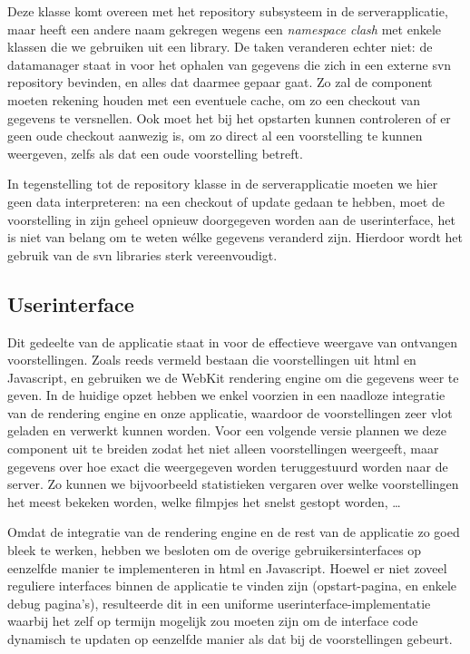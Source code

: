 Deze klasse komt overeen met het repository subsysteem in de serverapplicatie, maar heeft een andere naam gekregen wegens een \emph{namespace clash} met enkele klassen die we gebruiken uit een library. De taken veranderen echter niet: de datamanager staat in  voor het ophalen van gegevens die zich in een externe \ac{svn} repository bevinden, en alles dat daarmee gepaar gaat. Zo zal de component moeten rekening houden met een eventuele cache, om zo een checkout van gegevens te versnellen. Ook moet het bij het opstarten kunnen controleren of er geen oude checkout aanwezig is, om zo direct al een voorstelling te kunnen weergeven, zelfs als dat een oude voorstelling betreft.

In tegenstelling tot de repository klasse in de serverapplicatie moeten we hier geen data interpreteren: na een checkout of update gedaan te hebben, moet de voorstelling in zijn geheel opnieuw doorgegeven worden aan de userinterface, het is niet van belang om te weten wélke gegevens veranderd zijn. Hierdoor wordt het gebruik van de \ac{svn} libraries sterk vereenvoudigt.

\subsection{Userinterface}

Dit gedeelte van de applicatie staat in voor de effectieve weergave van ontvangen voorstellingen. Zoals reeds vermeld bestaan die voorstellingen uit \ac{html} en Javascript, en gebruiken we de WebKit rendering engine om die gegevens weer te geven. In de huidige opzet hebben we enkel voorzien in een naadloze integratie van de rendering engine en onze applicatie, waardoor de voorstellingen zeer vlot geladen en verwerkt kunnen worden. Voor een volgende versie plannen we deze component uit te breiden zodat het niet alleen voorstellingen weergeeft, maar gegevens over hoe exact die weergegeven worden teruggestuurd worden naar de server. Zo kunnen we bijvoorbeeld statistieken vergaren over welke voorstellingen het meest bekeken worden, welke filmpjes het snelst gestopt worden, \ldots

Omdat de integratie van de rendering engine en de rest van de applicatie zo goed bleek te werken, hebben we besloten om de overige gebruikersinterfaces op eenzelfde manier te implementeren in \ac{html} en Javascript. Hoewel er niet zoveel reguliere interfaces binnen de applicatie te vinden zijn (opstart-pagina, en enkele debug pagina's), resulteerde dit in een uniforme userinterface-implementatie waarbij het zelf op termijn mogelijk zou moeten zijn om de interface code dynamisch te updaten op eenzelfde manier als dat bij de voorstellingen gebeurt.

